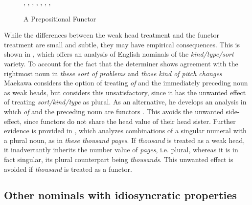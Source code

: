 \documentclass[output=paper]{langsci/langscibook}
\begin{document}
\begin{figure}
\begin{center}
\footnotesize
\tree
{,
  {,
    {}},
  {,
    {,
      {}},  
    {,
      {}}}}
\normalsize
\caption{\label{beau} A Prepositional Functor }
\end{center}
\end{figure}

While the differences between the weak head treatment and the functor treatment are small and subtle, 
they may have empirical consequences. This is shown in \citet{Maekawa15}, which offers 
an analysis of English nominals of the {\it kind/type/sort\/} variety.  
To account for the fact that the determiner shows agreement with the 
rightmost noun in {\it these sort of problems\/} and {\it those kind of pitch changes\/}
Maekawa considers the option of treating {\it of\/} and the immediately preceding noun as 
weak heads, but considers this unsatisfactory, since it has the unwanted effect of treating 
{\it sort/kind/type} as plural. As an alternative, he develops an analysis in which {\it of\/} and 
the preceding noun are functors \citep[149]{Maekawa15}. This avoids the unwanted side-effect, 
since functors do not share the {\sc head} value of their head sister. 
Further evidence is provided in \citet{Maekawa16}, which analyzes combinations of a   
singular numeral with a plural noun, as in {\it these thousand pages\/}. If 
{\it thousand} is treated as a weak head, it inadvertantly inherits the number value of
{\it pages}, i.e. plural, whereas it is in fact singular, its plural counterpart being 
{\it thousands}. This unwanted effect is avoided if {\it thousand\/} is treated as a functor.


\subsection{Other nominals with idiosyncratic properties} 
\end{document}
